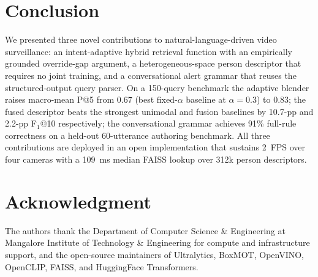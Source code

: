﻿\documentclass[conference]{IEEEtran}
\theoremstyle{definition}
\begin{document}
\section{Conclusion}

We presented three novel contributions to natural-language-driven video surveillance: an intent-adaptive hybrid retrieval function with an empirically grounded override-gap argument, a heterogeneous-space person descriptor that requires no joint training, and a conversational alert grammar that reuses the structured-output query parser. On a 150-query benchmark the adaptive blender raises macro-mean P@5 from 0.67 (best fixed-$\alpha$ baseline at $\alpha{=}0.3$) to 0.83; the fused descriptor beats the strongest unimodal and fusion baselines by 10.7-pp and 2.2-pp F$_1$@10 respectively; the conversational grammar achieves 91\% full-rule correctness on a held-out 60-utterance authoring benchmark. All three contributions are deployed in an open implementation that sustains 2~FPS over four cameras with a 109~ms median FAISS lookup over 312k person descriptors.

\section*{Acknowledgment}
The authors thank the Department of Computer Science \& Engineering at Mangalore Institute of Technology \& Engineering for compute and infrastructure support, and the open-source maintainers of Ultralytics, BoxMOT, OpenVINO, OpenCLIP, FAISS, and HuggingFace Transformers.
\end{document}
